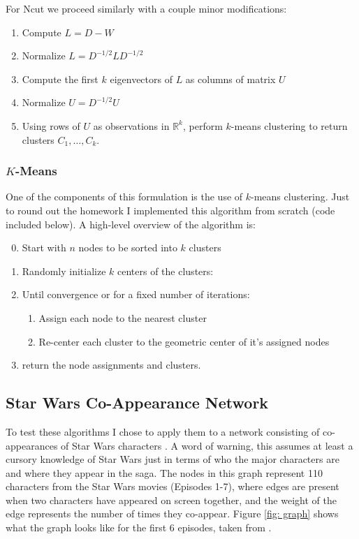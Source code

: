 \documentclass[12pt]{article} \usepackage[utf8]{inputenc}
\begin{document}
For Ncut we proceed similarly with a couple minor modifications:
\begin{enumerate}[label=(\arabic*)]
  \item Compute $L = D - W$
  \item Normalize $L = D^{-1/2}L D^{-1/2}$
  \item Compute the first $k$ eigenvectors of $L$ as columns of matrix $U$
  \item Normalize $U = D^{-1/2}U$
  \item Using rows of $U$ as observations in $\mathbb{R}^k$, perform $k$-means clustering to return clusters $C_1, \dots, C_k$.
\end{enumerate}


\subsubsection*{$K$-Means}

One of the components of this formulation is the use of $k$-means clustering. Just to round out the homework I implemented this algorithm from scratch (code included below). A high-level overview of the algorithm is:
\begin{enumerate}[label=(\arabic*)]
  \setcounter{enumi}{-1}
  \item Start with $n$ nodes to be sorted into $k$ clusters
  \item Randomly initialize $k$ centers of the clusters:
  \item Until convergence or for a fixed number of iterations:
  \begin{enumerate}[label=(\roman*)]
    \item Assign each node to the nearest cluster
    \item Re-center each cluster to the geometric center of it's assigned nodes
  \end{enumerate}
  \item return the node assignments and clusters.
\end{enumerate}

\subsection*{Star Wars Co-Appearance Network}

To test these algorithms I chose to apply them to a network consisting of co-appearances of Star Wars characters \cite{star-wars}. A word of warning, this assumes at least a cursory knowledge of Star Wars just in terms of who the major characters are and where they appear in the saga. The nodes in this graph represent 110 characters from the Star Wars movies (Episodes 1-7), where edges are present when two characters have appeared on screen together, and the weight of the edge represents the number of times they co-appear.
Figure \ref{fig: graph} shows what the graph looks like for the first 6 episodes, taken from \cite{star-wars}.
\end{document}
